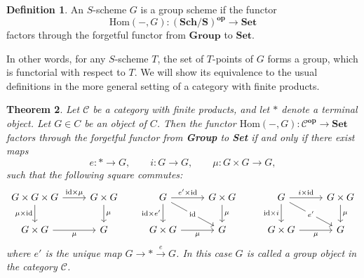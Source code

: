 \documentclass{article}
\newtheorem{theorem}{Theorem}[section]
\theoremstyle{definition}
\newtheorem{definition}[theorem]{Definition}
\theoremstyle{remark}
\theoremstyle{plain}
\newcommand{\mc}[1]{\mathcal{#1}}
\begin{document}
\begin{definition}
	An $S$-scheme $G$ is a group scheme if the functor 
	\[\text{Hom}(-, G): (\textbf{Sch/S})^{\textbf{op}} \to \textbf{Set}\]
	factors through the forgetful functor from $\textbf{Group}$ to $\textbf{Set}$.
\end{definition}

In other words, for any $S$-scheme $T$, the set of $T$-points of $G$ forms a group, which is functorial with respect to $T$.
We will show its equivalence to the usual definitions in the more general setting of a category with finite products.

\begin{theorem}\label{theo:group-object}
	Let $\mc{C}$ be a category with finite products, and let $*$ denote a terminal object.
	Let $G \in C$ be an object of $C$.
	Then the functor $\text{Hom}(-, G): \mc{C}^{\textbf{op}} \to \textbf{Set}$ factors through the forgetful functor from \textbf{Group} to \textbf{Set} if and only if there exist maps 
\[e: * \to G, \quad \quad i:G \to G, \quad \quad \mu: G \times G \to G, \]
such that the following square commutes:
\begin{equation}\label{eq:1}
\begin{tikzcd}
	{G\times G \times G} & {G \times G} & G & {G \times G} & G & {G \times G} \\
	{G \times G} & G & {G \times G} & G & {G \times G} & G
	\arrow["{\text{id} \times \mu}", from=1-1, to=1-2]
	\arrow["{\mu \times \text{id} }"', from=1-1, to=2-1]
	\arrow["\mu", from=1-2, to=2-2]
	\arrow["{e' \times \text{id}}", from=1-3, to=1-4]
	\arrow["{\text{id} \times e'}"', from=1-3, to=2-3]
	\arrow["{\text{id}}"{description}, from=1-3, to=2-4]
	\arrow["\mu", from=1-4, to=2-4]
	\arrow["{i \times \text{id}}", from=1-5, to=1-6]
	\arrow["{\text{id} \times i}"', from=1-5, to=2-5]
	\arrow["{e'}"{description}, from=1-5, to=2-6]
	\arrow["\mu", from=1-6, to=2-6]
	\arrow["\mu"', from=2-1, to=2-2]
	\arrow["\mu"', from=2-3, to=2-4]
	\arrow["\mu"', from=2-5, to=2-6]
\end{tikzcd}
\end{equation}
where $e'$ is the unique map $G \to * \xrightarrow{e} G$.
In this case $G$ is called a group object in the category $\mc{C}$.
\end{theorem}
\end{document}
